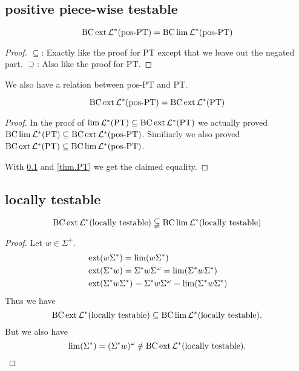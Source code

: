 \subsection{positive piece-wise testable}

\label{thm.ext.lim.posPT}
\begin{thm}
\[ \operatorname{BC} \operatorname{ext} \mathcal{L}^* (\textup{\textrm{pos-PT}}) = \operatorname{BC} \lim \mathcal{L}^* (\textup{\textrm{pos-PT}}) \]
\end{thm}

\begin{proof}
$\subseteq$: Exactly like the proof for PT except that we leave out the negated part.
$\supseteq$: Also like the proof for PT.
\end{proof}

We also have a relation between pos-PT and PT.

\begin{thm}
\[ \operatorname{BC} \operatorname{ext} \mathcal{L}^*(\textup{\textrm{pos-PT}}) = \operatorname{BC} \operatorname{ext} \mathcal{L}^* (\textup{\textrm{PT}}) \]

\begin{proof}
In the proof of $\lim \mathcal{L}^*(\textup{\textrm{PT}}) \subseteq \operatorname{BC} \operatorname{ext} \mathcal{L}^* (\textup{\textrm{PT}})$ we actually proved $\operatorname{BC} \lim \mathcal{L}^*(\textup{\textrm{PT}}) \subseteq \operatorname{BC} \operatorname{ext} \mathcal{L}^* (\textup{\textrm{pos-PT}})$. Similiarly we also proved $\operatorname{BC} \operatorname{ext} \mathcal{L}^* (\textup{\textrm{PT}}) \subseteq \operatorname{BC} \lim \mathcal{L}^* (\textup{\textrm{pos-PT}})$.

With \ref{thm.ext.lim.posPT} and \ref{thm.PT} we get the claimed equality.
\end{proof}
\end{thm}


\subsection{locally testable}

\begin{thm}
\[ \operatorname{BC} \operatorname{ext} \mathcal{L}^* (\textup{\textrm{locally testable}}) \subsetneqq \operatorname{BC} \lim \mathcal{L}^*(\textup{\textrm{locally testable}})  \]
\end{thm}

\begin{proof}
Let $w \in \Sigma^+$.
\begin{align*}
& \operatorname{ext} (w \Sigma^*) = \lim(w \Sigma^*) \\
& \operatorname{ext}( \Sigma^* w) = \Sigma^* w \Sigma^\omega = \lim( \Sigma^* w \Sigma^* ) \\
& \operatorname{ext}( \Sigma^* w \Sigma^*) = \Sigma^* w \Sigma^\omega = \lim( \Sigma^* w \Sigma^* )
\end{align*}
Thus we have
\[ \operatorname{BC} \operatorname{ext} \mathcal{L}^* (\textup{\textrm{locally testable}}) \subseteq \operatorname{BC} \lim \mathcal{L}^*(\textup{\textrm{locally testable}}) . \]
But we also have
\[ \lim(\Sigma^*) = (\Sigma^* w)^\omega \notin \operatorname{BC} \operatorname{ext} \mathcal{L}^* (\textup{\textrm{locally testable}}) . \]
\end{proof}


